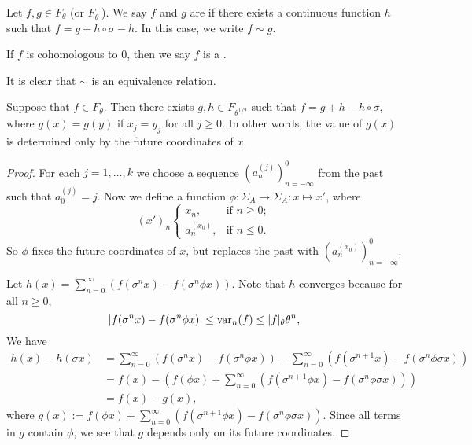 \begin{definition}
	Let $f, g \in F_\theta$ (or $F_\theta^+$). We say $f$ and $g$ are  if there exists a continuous function $h$ such that $f = g + h \circ \sigma - h$. In this case, we write $f \sim g$.
	
	If $f$ is cohomologous to $0$, then we say $f$ is a .
\end{definition}

\begin{remark}
	It is clear that $\sim$ is an equivalence relation.
\end{remark}

\begin{proposition} \label{prop:pp-1-2}
	Suppose that $f \in F_\theta$. Then there exists $g, h \in F_{\theta^{1 / 2}}$ such that $f = g + h - h \circ \sigma$, where $g(x) = g(y)$ if $x_j = y_j$ for all $j \geq 0$. In other words, the value of $g(x)$ is determined only by the future coordinates of $x$.
	\begin{proof}
		For each $j = 1, \dots, k$ we choose a sequence $(a_n^{(j)})_{n = -\infty}^0$ from the past such that $a_0^{(j)} = j$. Now we define a function $\phi : \Sigma_A \to \Sigma_A : x \mapsto x'$, where
		\[
			(x')_n
			\begin{cases}
				x_n, & \text{if } n \geq 0; \\
				a_n^{(x_0)}, & \text{if } n \leq 0.
			\end{cases}
		\]
		So $\phi$ fixes the future coordinates of $x$, but replaces the past with $(a_n^{(x_0)})_{n = -\infty}^0$.
		
		Let $h(x) = \sum_{n = 0}^\infty{(f(\sigma^n{x}) - f(\sigma^n \phi{x}))}$. Note that $h$ converges because for all $n \geq 0$,
		\[
			|f(\sigma^n{x}) - f(\sigma^n \phi{x})| \leq \operatorname{var}_n(f) \leq |f|_\theta \theta^n,
		\]
		We have
		\begin{align*}
			h(x) - h(\sigma{x}) &= \sum_{n = 0}^\infty{(f(\sigma^n{x}) - f(\sigma^n \phi{x}))} - \sum_{n = 0}^\infty{(f(\sigma^{n + 1}{x}) - f(\sigma^n \phi \sigma{x}))} \\
				&= f(x) - \left(f(\phi{x}) + \sum_{n = 0}^\infty{(f(\sigma^{n + 1} \phi{x}) - f(\sigma^n \phi \sigma{x}))}\right) \\
				&= f(x) - g(x),
		\end{align*}
		where $g(x) := f(\phi{x}) + \sum_{n = 0}^\infty{(f(\sigma^{n + 1} \phi{x}) - f(\sigma^n \phi \sigma{x}))}$. Since all terms in $g$ contain $\phi$, we see that $g$ depends only on its future coordinates.
		

\end{proof}
\end{proposition}
